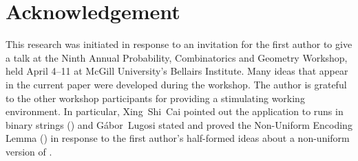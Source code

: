 \documentclass{patmorin}
\begin{document}
\section*{Acknowledgement}

This research was initiated in response to an invitation for the first
author to give a talk at the Ninth Annual Probability, Combinatorics
and Geometry Workshop, held April 4--11 at McGill University's
Bellairs Institute.  Many ideas that appear in the current paper were
developed during the workshop. The author is grateful to the other
workshop participants for providing a stimulating working environment.
In particular, Xing~Shi~Cai pointed out the application to runs in
binary strings () and G\'abor~Lugosi stated and proved
the Non-Uniform Encoding Lemma () in response to the first
author's half-formed ideas about a non-uniform version of .

{}

\end{document}
